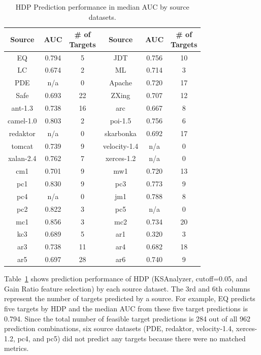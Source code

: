 \begin{table}[!t]
\caption{HDP Prediction performance in median AUC by source datasets.}
\label{tab:by_source}
\begin{tabular}{|c||c|c||c||c|c|}
\hline
\bf{Source}	& \bf{AUC} 	&\specialcell{\bf{\# of}\\\bf{Targets}} &\bf{ Source} & \bf{AUC} 	&\specialcell{\bf{\# of}\\\bf{Targets}} \\ \hline
\hline
EQ	&0.794	&5	&JDT	&0.756	&10	\\ \hline
LC	&0.674	&2	&ML	&0.714	&3	\\ \hline
PDE	&n/a	&0	&Apache	&0.720	&17	\\ \hline
Safe	&0.693	&22	&ZXing	&0.707	&12	\\ \hline
ant-1.3	&0.738	&16	&arc	&0.667	&8	\\ \hline
camel-1.0	&0.803	&2	&poi-1.5	&0.756	&6	\\ \hline
redaktor	&n/a	&0	&skarbonka	&0.692	&17	\\ \hline
tomcat	&0.739	&9	&velocity-1.4	&n/a	&0	\\ \hline
xalan-2.4	&0.762	&7	&xerces-1.2	&n/a	&0	\\ \hline
cm1	&0.701	&9	&mw1	&0.720	&13	\\ \hline
pc1	&0.830	&9	&pc3	&0.773	&9	\\ \hline
pc4	&n/a	&0	&jm1	&0.788	&8	\\ \hline
pc2	&0.822	&3	&pc5	&n/a	&0	\\ \hline
mc1	&0.856	&3	&mc2	&0.734	&20	\\ \hline
kc3	&0.689	&5	&ar1	&0.320	&3	\\ \hline
ar3	&0.738	&11	&ar4	&0.682	&18	\\ \hline
ar5	&0.697	&28	&ar6	&0.740	&9	\\ \hline
\end{tabular}
\end{table}

Table~\ref{tab:by_source} shows prediction performance of HDP (KSAnalyzer, cutoff=0.05, and Gain Ratio feature selection) by each source dataset. The 3rd and 6th columns represent the number of targets predicted by a source. For example, EQ predicts five targets by HDP and the median AUC from these five target predictions is 0.794. Since the total number of feasible target predictions is 284 out of all 962 prediction combinations, six source datasets (PDE, redaktor, velocity-1.4, xerces-1.2, pc4, and pc5) did not predict any targets because there were no matched metrics.

